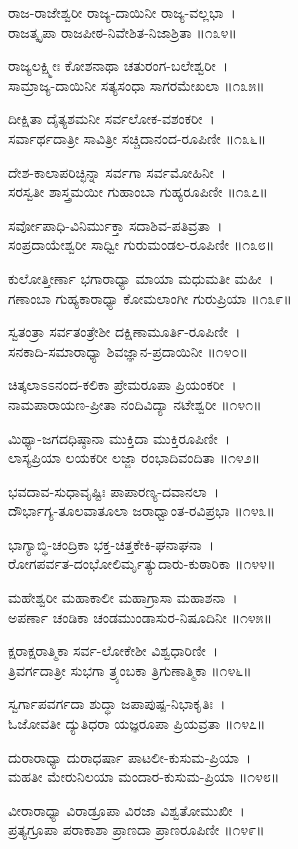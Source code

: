 ರಾಜ-ರಾಜೇಶ್ವರೀ ರಾಜ್ಯ-ದಾಯಿನೀ ರಾಜ್ಯ-ವಲ್ಲಭಾ~।\\
ರಾಜತ್ಕೃಪಾ ರಾಜಪೀಠ-ನಿವೇಶಿತ-ನಿಜಾಶ್ರಿತಾ ॥೧೩೪॥

ರಾಜ್ಯಲಕ್ಷ್ಮೀಃ ಕೋಶನಾಥಾ ಚತುರಂಗ-ಬಲೇಶ್ವರೀ~।\\
ಸಾಮ್ರಾಜ್ಯ-ದಾಯಿನೀ ಸತ್ಯಸಂಧಾ ಸಾಗರಮೇಖಲಾ ॥೧೩೫॥

ದೀಕ್ಷಿತಾ ದೈತ್ಯಶಮನೀ ಸರ್ವಲೋಕ-ವಶಂಕರೀ~।\\
ಸರ್ವಾರ್ಥದಾತ್ರೀ ಸಾವಿತ್ರೀ ಸಚ್ಚಿದಾನಂದ-ರೂಪಿಣೀ  ॥೧೩೬॥

ದೇಶ-ಕಾಲಾಪರಿಚ್ಛಿನ್ನಾ ಸರ್ವಗಾ ಸರ್ವಮೋಹಿನೀ~।\\
ಸರಸ್ವತೀ ಶಾಸ್ತ್ರಮಯೀ ಗುಹಾಂಬಾ ಗುಹ್ಯರೂಪಿಣೀ ॥೧೩೭॥

ಸರ್ವೋಪಾಧಿ-ವಿನಿರ್ಮುಕ್ತಾ ಸದಾಶಿವ-ಪತಿವ್ರತಾ~।\\
ಸಂಪ್ರದಾಯೇಶ್ವರೀ ಸಾಧ್ವೀ ಗುರುಮಂಡಲ-ರೂಪಿಣೀ ॥೧೩೮॥

ಕುಲೋತ್ತೀರ್ಣಾ ಭಗಾರಾಧ್ಯಾ ಮಾಯಾ ಮಧುಮತೀ ಮಹೀ~।\\
ಗಣಾಂಬಾ ಗುಹ್ಯಕಾರಾಧ್ಯಾ ಕೋಮಲಾಂಗೀ ಗುರುಪ್ರಿಯಾ ॥೧೩೯॥

ಸ್ವತಂತ್ರಾ ಸರ್ವತಂತ್ರೇಶೀ ದಕ್ಷಿಣಾಮೂರ್ತಿ-ರೂಪಿಣೀ~।\\
ಸನಕಾದಿ-ಸಮಾರಾಧ್ಯಾ ಶಿವಜ್ಞಾನ-ಪ್ರದಾಯಿನೀ ॥೧೪೦॥

ಚಿತ್ಕಲಾಽಽನಂದ-ಕಲಿಕಾ ಪ್ರೇಮರೂಪಾ ಪ್ರಿಯಂಕರೀ~।\\
ನಾಮಪಾರಾಯಣ-ಪ್ರೀತಾ ನಂದಿವಿದ್ಯಾ ನಟೇಶ್ವರೀ ॥೧೪೧॥

ಮಿಥ್ಯಾ-ಜಗದಧಿಷ್ಠಾನಾ ಮುಕ್ತಿದಾ ಮುಕ್ತಿರೂಪಿಣೀ~।\\
ಲಾಸ್ಯಪ್ರಿಯಾ ಲಯಕರೀ ಲಜ್ಜಾ ರಂಭಾದಿವಂದಿತಾ ॥೧೪೨॥

ಭವದಾವ-ಸುಧಾವೃಷ್ಟಿಃ ಪಾಪಾರಣ್ಯ-ದವಾನಲಾ~।\\
ದೌರ್ಭಾಗ್ಯ-ತೂಲವಾತೂಲಾ ಜರಾಧ್ವಾಂತ-ರವಿಪ್ರಭಾ ॥೧೪೩॥

ಭಾಗ್ಯಾಬ್ಧಿ-ಚಂದ್ರಿಕಾ ಭಕ್ತ-ಚಿತ್ತಕೇಕಿ-ಘನಾಘನಾ~।\\
ರೋಗಪರ್ವತ-ದಂಭೋಲಿರ್ಮೃತ್ಯುದಾರು-ಕುಠಾರಿಕಾ ॥೧೪೪॥

ಮಹೇಶ್ವರೀ ಮಹಾಕಾಲೀ ಮಹಾಗ್ರಾಸಾ ಮಹಾಶನಾ~।\\
ಅಪರ್ಣಾ ಚಂಡಿಕಾ ಚಂಡಮುಂಡಾಸುರ-ನಿಷೂದಿನೀ ॥೧೪೫॥

ಕ್ಷರಾಕ್ಷರಾತ್ಮಿಕಾ ಸರ್ವ-ಲೋಕೇಶೀ ವಿಶ್ವಧಾರಿಣೀ~।\\
ತ್ರಿವರ್ಗದಾತ್ರೀ ಸುಭಗಾ ತ್ರ್ಯಂಬಕಾ ತ್ರಿಗುಣಾತ್ಮಿಕಾ ॥೧೪೬॥

ಸ್ವರ್ಗಾಪವರ್ಗದಾ ಶುದ್ಧಾ ಜಪಾಪುಷ್ಪ-ನಿಭಾಕೃತಿಃ~।\\
ಓಜೋವತೀ ದ್ಯುತಿಧರಾ ಯಜ್ಞರೂಪಾ ಪ್ರಿಯವ್ರತಾ ॥೧೪೭॥

ದುರಾರಾಧ್ಯಾ ದುರಾಧರ್ಷಾ ಪಾಟಲೀ-ಕುಸುಮ-ಪ್ರಿಯಾ~।\\
ಮಹತೀ ಮೇರುನಿಲಯಾ ಮಂದಾರ-ಕುಸುಮ-ಪ್ರಿಯಾ ॥೧೪೮॥

ವೀರಾರಾಧ್ಯಾ ವಿರಾಡ್ರೂಪಾ ವಿರಜಾ ವಿಶ್ವತೋಮುಖೀ~।\\
ಪ್ರತ್ಯಗ್ರೂಪಾ ಪರಾಕಾಶಾ ಪ್ರಾಣದಾ ಪ್ರಾಣರೂಪಿಣೀ ॥೧೪೯॥


